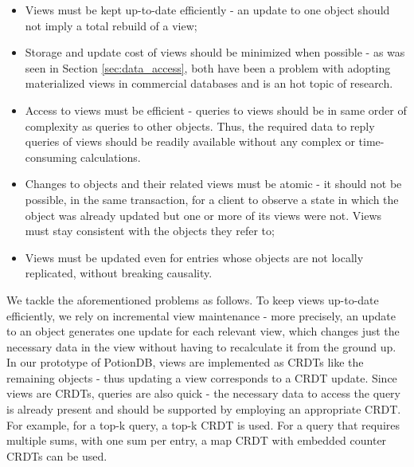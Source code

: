 \begin{itemize}
	\item Views must be kept up-to-date efficiently - an update to one object should not imply a total rebuild of a view;
	\item Storage and update cost of views should be minimized when possible - as was seen in Section \ref{sec:data_access}, both have been a problem with adopting materialized views in commercial databases and is an hot topic of research.
	\item Access to views must be efficient - queries to views should be in same order of complexity as queries to other objects.
	Thus, the required data to reply queries of views should be readily available without any complex or time-consuming calculations.
	\item Changes to objects and their related views must be atomic - it should not be possible, in the same transaction, for a client to observe a state in which the object was already updated but one or more of its views were not. Views must stay consistent with the objects they refer to;
	\item Views must be updated even for entries whose objects are not locally replicated, without breaking causality.

\end{itemize}

We tackle the aforementioned problems as follows.
To keep views up-to-date efficiently, we rely on incremental view maintenance - more precisely, an update to an object generates one update for each relevant view, which changes just the necessary data in the view without having to recalculate it from the ground up.
In our prototype of PotionDB, views are implemented as CRDTs like the remaining objects - thus updating a view corresponds to a CRDT update.
Since views are CRDTs, queries are also quick - the necessary data to access the query is already present and should be supported by employing an appropriate CRDT.
For example, for a top-k query, a top-k CRDT is used. For a query that requires multiple sums, with one sum per entry, a map CRDT with embedded counter CRDTs can be used.

